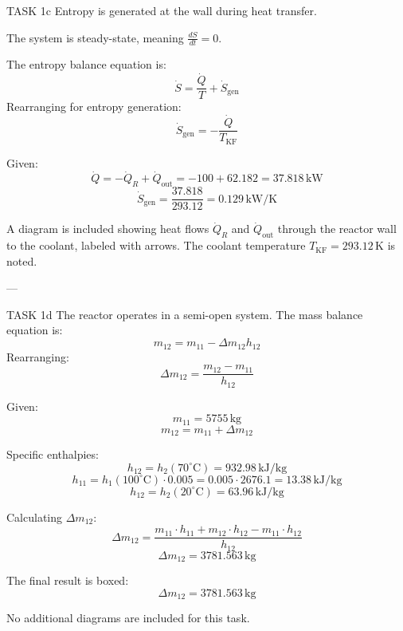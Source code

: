 TASK 1c  
Entropy is generated at the wall during heat transfer.  

The system is steady-state, meaning \( \frac{dS}{dt} = 0 \).  

The entropy balance equation is:  
\[
\dot{S} = \frac{\dot{Q}}{T} + \dot{S}_{\text{gen}}
\]  
Rearranging for entropy generation:  
\[
\dot{S}_{\text{gen}} = -\frac{\dot{Q}}{T_{\text{KF}}}
\]  

Given:  
\[
\dot{Q} = -\dot{Q}_R + \dot{Q}_{\text{out}} = -100 + 62.182 = 37.818 \, \text{kW}
\]  
\[
\dot{S}_{\text{gen}} = \frac{37.818}{293.12} = 0.129 \, \text{kW/K}
\]  

A diagram is included showing heat flows \( \dot{Q}_R \) and \( \dot{Q}_{\text{out}} \) through the reactor wall to the coolant, labeled with arrows. The coolant temperature \( T_{\text{KF}} = 293.12 \, \text{K} \) is noted.  

---

TASK 1d  
The reactor operates in a semi-open system. The mass balance equation is:  
\[
m_{12} = m_{11} - \Delta m_{12} h_{12}
\]  
Rearranging:  
\[
\Delta m_{12} = \frac{m_{12} - m_{11}}{h_{12}}
\]  

Given:  
\[
m_{11} = 5755 \, \text{kg}
\]  
\[
m_{12} = m_{11} + \Delta m_{12}
\]  

Specific enthalpies:  
\[
h_{12} = h_2(70^\circ\text{C}) = 932.98 \, \text{kJ/kg}
\]  
\[
h_{11} = h_1(100^\circ\text{C}) \cdot 0.005 = 0.005 \cdot 2676.1 = 13.38 \, \text{kJ/kg}
\]  
\[
h_{12} = h_2(20^\circ\text{C}) = 63.96 \, \text{kJ/kg}
\]  

Calculating \( \Delta m_{12} \):  
\[
\Delta m_{12} = \frac{m_{11} \cdot h_{11} + m_{12} \cdot h_{12} - m_{11} \cdot h_{12}}{h_{12}}
\]  
\[
\Delta m_{12} = 3781.563 \, \text{kg}
\]  

The final result is boxed:  
\[
\Delta m_{12} = 3781.563 \, \text{kg}
\]  

No additional diagrams are included for this task.
